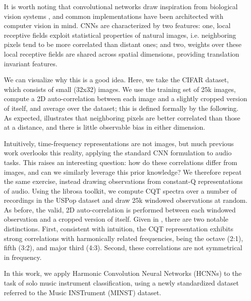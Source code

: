 \documentclass{article}
\begin{document}
It is worth noting that convolutional networks draw inspiration from biological vision systems \cite{Hubel1964, LeCun1998}, and common implementations have been architected with computer vision in mind.
CNNs are characterized by two features:
one, local receptive fields exploit statistical properties of natural images, i.e. neighboring pixels tend to be more correlated than distant ones;
and two, weights over these local receptive fields are shared across spatial dimensions, providing translation invariant features.

We can visualize why this is a good idea.
Here, we take the CIFAR dataset, which consists of small (32x32) images.
We use the training set of 25k images, compute a 2D auto-correlation between each image and a slightly cropped version of itself, and average over the dataset;
this is defined formally by the following.
As expected,  illustrates that neighboring pixels are better correlated than those at a distance, and there is little observable bias in either dimension.

Intuitively, time-frequency representations are not images, but much previous work overlooks this reality, applying the standard CNN formulation to audio tasks.
This raises an interesting question: how do these correlations differ from images, and can we similarly leverage this prior knowledge?
We therefore repeat the same exercise, instead drawing observations from constant-Q representations of audio.
Using the librosa toolkit, we compute CQT spectra over a number of recordings in the USPop dataset\cite{Ellis2002} and draw 25k windowed observations at random.
As before, the valid, 2D auto-correlation is performed between each windowed observation and a cropped version of itself.
Given in , there are two notable distinctions.
First, consistent with intuition, the CQT representation exhibits strong correlations with harmonically related frequencies, being the octave (2:1), fifth (3:2), and major third (4:3).
Second, these correlations are not symmetrical in frequency.

\begin{figure}
    \label{fig:cqt_corr}
\end{figure}
\begin{figure}
    \label{fig:image_corr}
\end{figure}

In this work, we apply Harmonic Convolution Neural Networks (HCNNs) to the task of solo music instrument classification, using a newly standardized dataset referred to the Music INSTrument (MINST) dataset.
\end{document}

